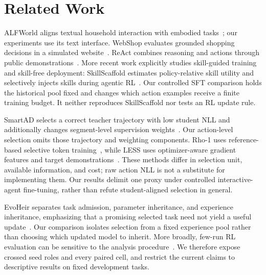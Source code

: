 \section{Related Work}
\label{sec:related}
ALFWorld aligns textual household interaction with embodied tasks~\citep{shridhar2021alfworld}; our experiments use its text interface. WebShop evaluates grounded shopping decisions in a simulated website~\citep{yao2022webshop}. ReAct combines reasoning and actions through public demonstrations~\citep{yao2023react}. More recent work explicitly studies skill-guided training and skill-free deployment: SkillScaffold estimates policy-relative skill utility and selectively injects skills during agentic RL~\citep{zhong2026skillscaffold}. Our controlled SFT comparison holds the historical pool fixed and changes which action examples receive a finite training budget. It neither reproduces SkillScaffold nor tests an RL update rule.

SmartAD selects a correct teacher trajectory with low student NLL and additionally changes segment-level supervision weights~\citep{tang2026smartad}. Our action-level selection omits those trajectory and weighting components. Rho-1 uses reference-based selective token training~\citep{lin2024rho}, while LESS uses optimizer-aware gradient features and target demonstrations~\citep{xia2024less}. These methods differ in selection unit, available information, and cost; raw action NLL is not a substitute for implementing them. Our results delimit one proxy under controlled interactive-agent fine-tuning, rather than refute student-aligned selection in general.

EvoHeir separates task admission, parameter inheritance, and experience inheritance, emphasizing that a promising selected task need not yield a useful update~\citep{yang2026evoheir}. Our comparison isolates selection from a fixed experience pool rather than choosing which updated model to inherit. More broadly, few-run RL evaluation can be sensitive to the analysis procedure~\citep{agarwal2021precipice}. We therefore expose crossed seed roles and every paired cell, and restrict the current claims to descriptive results on fixed development tasks.

